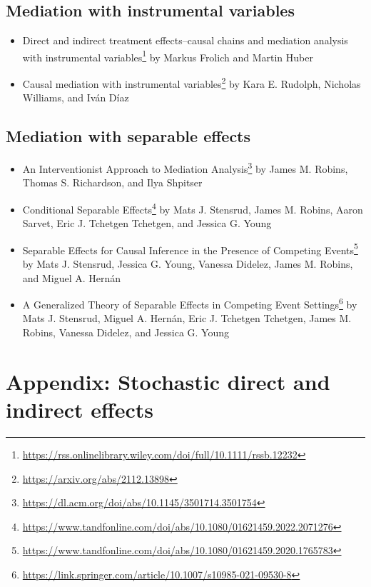 \documentclass[
  12pt,
]{book}
\providecommand{\tightlist}{%
  \setlength{\itemsep}{0pt}\setlength{\parskip}{0pt}}
\renewcommand{\href}[2]{#2\footnote{\url{#1}}}
\theoremstyle{definition}
\theoremstyle{definition}
\theoremstyle{definition}
\newcommand{\1}{\mathbbm{1}}
\begin{document}
\hypertarget{mediation-with-instrumental-variables}{%
\section{Mediation with instrumental variables}\label{mediation-with-instrumental-variables}}

\begin{itemize}
\tightlist
\item
  \href{https://rss.onlinelibrary.wiley.com/doi/full/10.1111/rssb.12232}{Direct and indirect treatment effects--causal chains and mediation analysis
  with instrumental
  variables}
  by Markus Frolich and Martin Huber
\item
  \href{https://arxiv.org/abs/2112.13898}{Causal mediation with instrumental
  variables} by Kara E. Rudolph, Nicholas
  Williams, and Iván Díaz
\end{itemize}

\hypertarget{mediation-with-separable-effects}{%
\section{Mediation with separable effects}\label{mediation-with-separable-effects}}

\begin{itemize}
\tightlist
\item
  \href{https://dl.acm.org/doi/abs/10.1145/3501714.3501754}{An Interventionist Approach to Mediation
  Analysis} by James M.
  Robins, Thomas S. Richardson, and Ilya Shpitser
\item
  \href{https://www.tandfonline.com/doi/abs/10.1080/01621459.2022.2071276}{Conditional Separable
  Effects}
  by Mats J. Stensrud, James M. Robins, Aaron Sarvet, Eric J. Tchetgen
  Tchetgen, and Jessica G. Young
\item
  \href{https://www.tandfonline.com/doi/abs/10.1080/01621459.2020.1765783}{Separable Effects for Causal Inference in the Presence of Competing
  Events} by
  Mats J. Stensrud, Jessica G. Young, Vanessa Didelez, James M. Robins, and
  Miguel A. Hernán
\item
  \href{https://link.springer.com/article/10.1007/s10985-021-09530-8}{A Generalized Theory of Separable Effects in Competing Event
  Settings} by
  Mats J. Stensrud, Miguel A. Hernán, Eric J. Tchetgen Tchetgen, James M.
  Robins, Vanessa Didelez, and Jessica G. Young
\end{itemize}

\hypertarget{stochastic}{%
\chapter{Appendix: Stochastic direct and indirect effects}\label{stochastic}}
\end{document}
